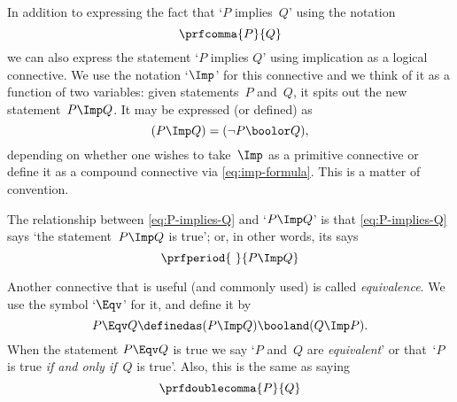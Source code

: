 In addition to expressing the fact that `$P$ implies~$Q$' using the notation
\begin{equation}\label{eq:P-implies-Q}
    \prfcomma
    {P}{Q}
\end{equation}
we can also express the statement `$P$ implies $Q$' using implication as a logical connective.
We use the notation `$\Imp$' for this connective and we think of it as a function of two variables:
given statements~$P$ and~$Q$, it spits out the new statement~$P \Imp Q$.
It may be expressed (or defined) as
\begin{equation}
    \label{eq:imp-formula}
    (P \Imp Q) = (\lnot P \boolor Q),
\end{equation}
depending on whether one wishes to take~$\Imp$ as a primitive connective or define it as a compound connective via \cref{eq:imp-formula}.
This is a matter of convention.

The relationship between \cref{eq:P-implies-Q} and `$P \Imp Q$' is that  \cref{eq:P-implies-Q} says `the statement~$P \Imp Q$ is true'; or, in other words, its says
\begin{equation*}
    \prfperiod
    {\ }{P \Imp Q}
\end{equation*}

Another connective that is useful (and commonly used) is called \emph{equivalence}.
We use the symbol `$\Eqv$' for it, and define it by
\begin{equation*}
    P \Eqv Q \definedas (P \Imp Q) \booland (Q \Imp P).
\end{equation*}
When the statement $P \Eqv Q$ is true we say `$P$ and~$Q$ are \emph{equivalent}' or that~`$P$ is true \emph{if and only if}~$Q$ is true'.
Also, this is the same as saying
\begin{equation*}
    \prfdoublecomma{
        P
    }{
        Q
    }
\end{equation*}
